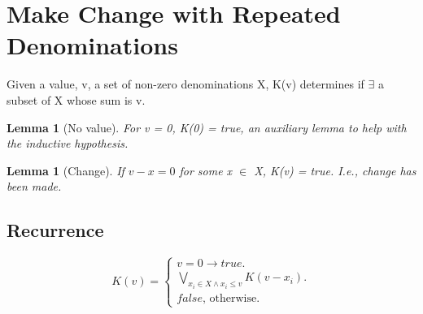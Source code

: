 \documentclass{article}
\newtheorem{lemma}[theorem]{Lemma}
\begin{document}
	
\section{Make Change with Repeated Denominations}
Given a value, v, a set of non-zero denominations X, K(v) determines if $\exists$ a subset of X whose sum is v.

\begin{lemma} [No value]
\label{bc1}	
For v = 0, K(0) = true, an auxiliary lemma to help with the inductive hypothesis.
\end{lemma}

\begin{lemma} [Change]
\label{bc2}	
If $v - x = 0$ for some x $\in$ X, K(v) = true. I.e., change has been made.
\end{lemma}

\subsection{Recurrence}
\begin{equation}
K(v)=			
\begin{cases}
v = 0 \to true.\\	
\underset{x_i \in X \land x_i \leq v}{\bigvee} K(v-x_i).\\
false \text{, otherwise.}
\end{cases}
\end{equation}
\end{document}
